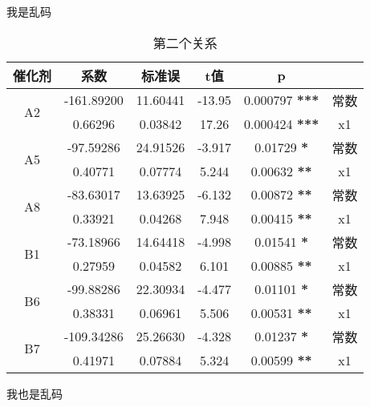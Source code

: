 \documentclass{article}
\begin{document}
我是乱码
\newpage
\newpage
\begin{table}
    \centering
    \caption{第二个关系}
    \begin{tabular}{c|c|c|c|c|c}
        \hline
        催化剂               & 系数       & 标准误   & t值    & p                     &      \\
        \hline
        \multirow{2}{*}{A2}  & -161.89200 & 11.60441 & -13.95 & 0.000797 \textbf{***} & 常数 \\
                             & 0.66296    & 0.03842  & 17.26  & 0.000424 \textbf{***} & x1   \\
        \hline
        \multirow{2}{*}{A5}  & -97.59286  & 24.91526 & -3.917 & 0.01729 \textbf{*}    & 常数 \\
                             & 0.40771    & 0.07774  & 5.244  & 0.00632 \textbf{**}   & x1   \\
        \hline
        \multirow{2}{*}{A8}  & -83.63017  & 13.63925 & -6.132 & 0.00872 \textbf{**}   & 常数 \\
                             & 0.33921    & 0.04268  & 7.948  & 0.00415 \textbf{**}   & x1   \\
        \hline
        \multirow{2}{*}{B1} & -73.18966  & 14.64418 & -4.998 & 0.01541 \textbf{*}    & 常数 \\
                             & 0.27959    & 0.04582  & 6.101  & 0.00885 \textbf{**}   & x1   \\
        \hline
        \multirow{2}{*}{B6} & -99.88286  & 22.30934 & -4.477 & 0.01101 \textbf{*}    & 常数 \\
                             & 0.38331    & 0.06961  & 5.506  & 0.00531 \textbf{**}   & x1   \\
        \hline
        \multirow{2}{*}{B7} & -109.34286 & 25.26630 & -4.328 & 0.01237 \textbf{*}    & 常数 \\
                             & 0.41971    & 0.07884  & 5.324  & 0.00599 \textbf{**}   & x1   \\
        \hline
    \end{tabular}
\end{table}
我也是乱码
\newpage
\end{document}
